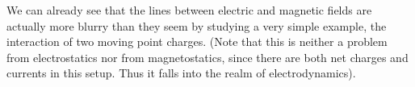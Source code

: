 \documentclass[../class_mech_main.tex]{subfiles}
\begin{document}
We can already see that the lines between electric and magnetic fields are actually more blurry than they seem by studying a very simple example, the interaction of two moving point charges. (Note that this is neither a problem from electrostatics nor from magnetostatics, since there are both net charges and currents in this setup. Thus it falls into the realm of electrodynamics).




\end{document}
